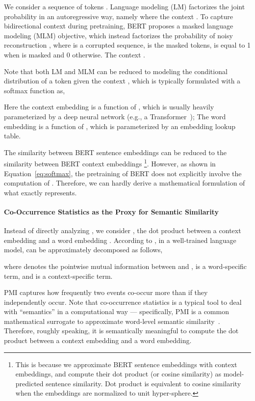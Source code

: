 \documentclass[11pt,a4paper]{article}
\begin{document}
We consider a sequence of tokens . Language modeling (LM) factorizes the joint probability  in an autoregressive way, namely  where the context . To capture bidirectional context during pretraining, BERT proposes a masked language modeling (MLM) objective, which instead factorizes the probability of noisy reconstruction , where  is a corrupted sequence,  is the masked tokens,  is equal to 1 when  is masked and 0 otherwise. The context .

Note that both LM and MLM can be reduced to modeling the conditional distribution of a token  given the context , which is typically formulated with a softmax function as,



Here the context embedding  is a function of , which is usually heavily parameterized by a deep neural network (e.g., a Transformer~\citep{vaswani2017attention}); The word embedding  is a function of , which is parameterized by an embedding lookup table. 

The similarity between BERT sentence embeddings can be reduced to the similarity between BERT context embeddings \footnote{This is because we approximate BERT sentence embeddings with context embeddings, and compute their dot product (or cosine similarity) as model-predicted sentence similarity. Dot product is equivalent to cosine similarity when the embeddings are normalized to unit hyper-sphere.}.
However, as shown in Equation~\ref{eq:softmax}, the pretraining of BERT does not explicitly involve the computation of . Therefore, we can hardly derive a mathematical formulation of what  exactly represents. 


\paragraph{Co-Occurrence Statistics as the Proxy for Semantic Similarity} 
Instead of directly analyzing , we consider , the dot product between a context embedding  and a word embedding . According to \citet{yang2017breaking}, in a well-trained language model,  can be approximately decomposed as follows,


where  denotes the pointwise mutual information between  and ,  is a word-specific term, and  is a context-specific term.

PMI captures how frequently two events co-occur more than if they independently occur. Note that co-occurrence statistics is a typical tool to deal with ``semantics'' in a computational way --- specifically, PMI is a common mathematical surrogate to approximate word-level semantic similarity~\cite{levy2014neural,ethayarajh2019towards}. Therefore, roughly speaking, it is semantically meaningful to compute the dot product between a context embedding and a word embedding. 
\end{document}
